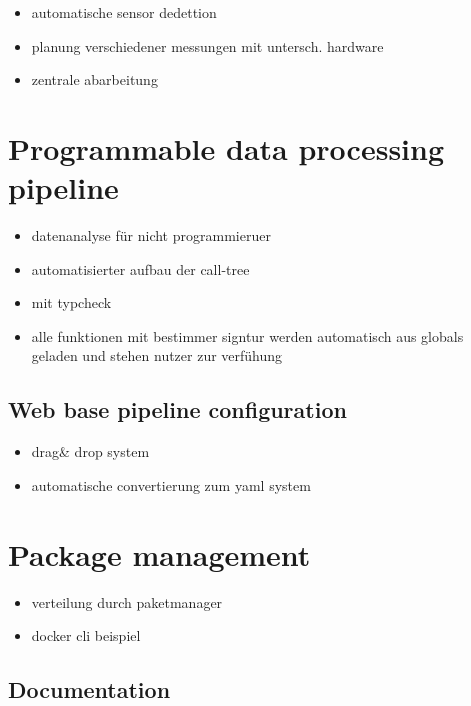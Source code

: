 \begin{itemize}
\tightlist
\item
  automatische sensor dedettion
\item
  planung verschiedener messungen mit untersch. hardware
\item
  zentrale abarbeitung
\end{itemize}

\hypertarget{programmable-data-processing-pipeline}{%
\section{Programmable data processing
pipeline}\label{programmable-data-processing-pipeline}}

\begin{itemize}
\tightlist
\item
  datenanalyse für nicht programmieruer
\item
  automatisierter aufbau der call-tree
\item
  mit typcheck
\item
  alle funktionen mit bestimmer signtur werden automatisch aus globals
  geladen und stehen nutzer zur verfühung
\end{itemize}

\hypertarget{web-base-pipeline-configuration}{%
\subsection{Web base pipeline
configuration}\label{web-base-pipeline-configuration}}

\begin{itemize}
\tightlist
\item
  drag\& drop system
\item
  automatische convertierung zum yaml system
\end{itemize}

\hypertarget{package-management}{%
\section{Package management}\label{package-management}}

\begin{itemize}
\tightlist
\item
  verteilung durch paketmanager
\item
  docker cli beispiel
\end{itemize}

\hypertarget{documentation}{%
\subsection{Documentation}\label{documentation}}

